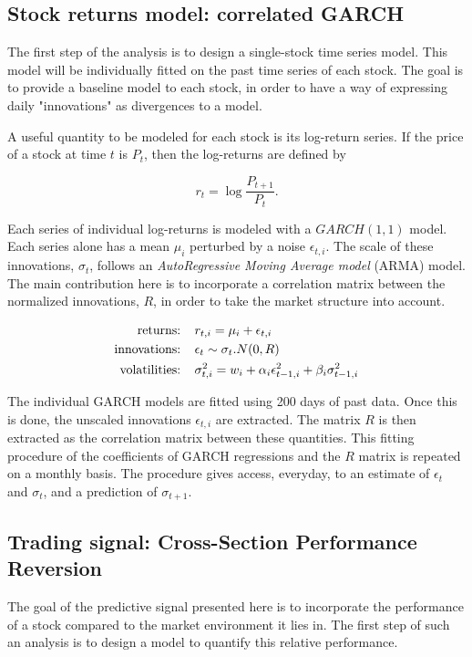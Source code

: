 \documentclass[letterpaper, 10 pt, conference]{ieeeconf}  %
\begin{document}
\subsection{Stock returns model: correlated GARCH}

The first step of the analysis is to design a single-stock time series model. This model will be individually fitted on the past time series of each stock. The goal is to provide a baseline model to each stock, in order to have a way of expressing daily "innovations" as divergences to a model. 

A useful quantity to be modeled for each stock is its log-return series. If the price of a stock at time $t$ is $P_t$, then the log-returns are defined by 

$$
r_t = \log\frac{P_{t+1}}{P_{t}}.
$$

Each series of individual log-returns is modeled with a $GARCH(1, 1)$ model. Each series alone has a mean $\mu_i$ perturbed by a noise $\epsilon_{t, i}$. The scale of these innovations, $\sigma_t$, follows an \textit{AutoRegressive Moving Average model} (ARMA) model. The main contribution here is to incorporate a correlation matrix between the normalized innovations, $R$, in order to take the market structure into account.

$$
\begin{aligned}
\textmd{returns: } \ \ &r_{t, i} = \mu_i + \epsilon_{t, i}\\
\textmd{innovations: } \ \  &\epsilon_{t} \sim \sigma_{t}.N(0, R)\\
\textmd{volatilities: }\ \ &\sigma_{t, i}^2 = w_i + \alpha_i \epsilon_{t-1, i}^2 + \beta_i \sigma_{t-1, i}^2
\end{aligned}
$$

The individual GARCH models are fitted using 200 days of past data. Once this is done, the unscaled innovations $\epsilon_{t, i}$ are extracted. The matrix $R$ is then extracted as the correlation matrix between these quantities. This fitting procedure of the coefficients of GARCH regressions and the $R$ matrix is repeated on a monthly basis. The procedure gives access, everyday, to an estimate of $\epsilon_{t}$ and $\sigma_{t}$, and a prediction of $\sigma_{t+1}$.

\subsection{Trading signal: Cross-Section Performance Reversion}

The goal of the predictive signal presented here is to incorporate the performance of a stock compared to the market environment it lies in. The first step of such an analysis is to design a model to quantify this relative performance. 
\end{document}
